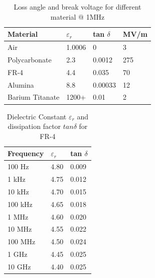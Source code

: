 		\begin{table}[h!]
			\centering
			\begin{tabular}{|m{0.2\textwidth}|m{}|m{}|m{}|}
				\hline
					\textbf{Material} & \textbf{$\varepsilon_r$} & \textbf{tan $\delta$} & \textbf{MV/m}\\
				\hline
				\hline
					Air & 1.0006 & 0  & 3  \\
				\hline
					Polycarbonate & 2.3 & 0.0012 & 275  \\
				\hline
					FR-4 & 4.4 & 0.035 & 70 \\
				\hline
					Alumina & 8.8 & 0.00033 & 12 \\
				\hline
					Barium Titanate & 1200+ & 0.01 & 2 \\
				\hline
			\end{tabular}
			\caption{Loss angle and break voltage for different material @ 1MHz}
			\label{Tab:LossAngle}
		\end{table}
		\begin{table}[h!]
			\centering
			\begin{tabular}{|m{}|m{}|m{}|}
				\hline
				\textbf{Frequency} &	\textbf{$\varepsilon_r$} & \textbf{tan $\delta$}\\
				\hline
				\hline
					 100 Hz	& 4.80& 0.009\\
				\hline
					 1 kHz	& 4.75& 0.012\\
				\hline
					 10 kHz	& 4.70& 0.015\\
				\hline
					 100 kHz& 4.65& 0.018\\
				\hline
					 1 MHz	& 4.60& 0.020\\
				\hline
					 10 MHz	& 4.55& 0.022\\
				\hline
					 100 MHz& 4.50& 0.024\\
				\hline
					 1 GHz  & 4.45& 0.025\\
				\hline
					 10 GHz & 4.40& 0.025\\		
				\hline			 
			\end{tabular}
			\caption{Dielectric Constant $\varepsilon_r$ and dissipation factor $tan \delta$ for FR-4}
			\label{Tab:LossAngleFR4}
		\end{table}
		
